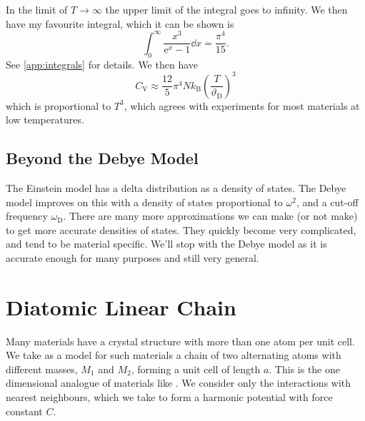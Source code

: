 \documentclass[fleqn]{NotesClass}
\newcommand*{\boltzmann}{k_{\mathrm{B}}}
\newcommand*{\e}{\mathrm{e}}
\newcommand*{\heatCapacityVolume}{C_{\mathrm{V}}}
\newcommand*{\debye}{\mathrm{D}}
\begin{document}
    In the limit of \(T \to \infty\) the upper limit of the integral goes to infinity.
    We then have my favourite integral, which it can be shown is
    \begin{equation}
        \int_{0}^{\infty} \frac{x^3}{\e^x - 1} \dd{x} = \frac{\pi^4}{15}.
    \end{equation}
    See \cref{app:integrals} for details.
    We then have
    \begin{equation}
        \heatCapacityVolume \approx \frac{12}{5} \pi^4N\boltzmann \left( \frac{T}{\vartheta_{\debye}} \right)^{3}
    \end{equation}
    which is proportional to \(T^3\), which agrees with experiments for most materials at low temperatures.
    
    \subsection{Beyond the Debye Model}
    The Einstein model has a delta distribution as a density of states.
    The Debye model improves on this with a density of states proportional to \(\omega^2\), and a cut-off frequency \(\omega_{\debye}\).
    There are many more approximations we can make (or not make) to get more accurate densities of states.
    They quickly become very complicated, and tend to be material specific.
    We'll stop with the Debye model as it is accurate enough for many purposes and still very general.
    
    \section{Diatomic Linear Chain}
    Many materials have a crystal structure with more than one atom per unit cell.
    We take as a model for such materials a chain of two alternating atoms with different masses, \(M_1\) and \(M_2\), forming a unit cell of length \(a\).
    This is the one dimensional analogue of materials like .
    We consider only the interactions with nearest neighbours, which we take to form a harmonic potential with force constant \(C\).
    
\end{document}
